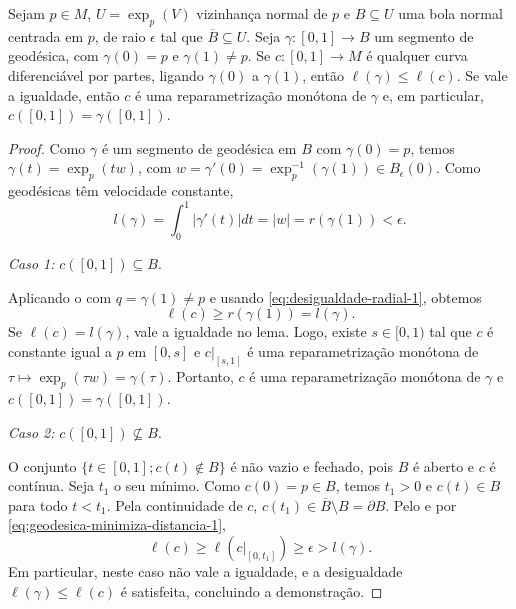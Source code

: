 \begin{theorem}
    \label{teo:geodesica-minimiza-distancia}
    Sejam $p \in M$, $U=\exp_{p}(V)$ vizinhança normal de $p$ e $B\subseteq U$ uma bola normal centrada em $p$, de raio $\epsilon$ tal que $\overline{B}\subseteq U$.
    Seja $\gamma:[0,1]\to B$ um segmento de geodésica, com $\gamma(0)=p$ e $\gamma(1)\neq p$.
    Se $c:[0,1]\to M$ é qualquer curva diferenciável por partes, ligando $\gamma(0)$ a $\gamma(1)$, então $\ell(\gamma)\leq \ell(c)$.
    Se vale a igualdade, então $c$ é uma reparametrização monótona de $\gamma$ e, em particular, $c([0,1])=\gamma([0,1])$.
    \begin{proof}

        Como $\gamma$ é um segmento de geodésica em $B$ com $\gamma(0)=p$, temos $\gamma(t)=\exp_{p}(tw)$, com $w=\gamma'(0)=\exp_{p}^{-1}(\gamma(1))\in B_{\epsilon}(0)$. Como geodésicas têm velocidade constante,
        \begin{equation}
            \label{eq:geodesica-minimiza-distancia-1}
            l(\gamma)=\int_{0}^{1}|\gamma'(t)|dt=|w|=r(\gamma(1))<\epsilon.
        \end{equation}

        \emph{Caso 1:} $c([0,1])\subseteq B$.

        Aplicando o  com $q=\gamma(1)\neq p$ e usando \eqref{eq:desigualdade-radial-1}, obtemos
        \begin{equation*}
            \ell(c)\geq r(\gamma(1))=l(\gamma).
        \end{equation*}
        Se $\ell(c)=l(\gamma)$, vale a igualdade no lema. Logo, existe $s\in[0,1)$ tal que $c$ é constante igual a $p$ em $[0,s]$ e $c|_{[s,1]}$ é uma reparametrização monótona de $\tau\mapsto\exp_{p}(\tau w)=\gamma(\tau)$. Portanto, $c$ é uma reparametrização monótona de $\gamma$ e $c([0,1])=\gamma([0,1])$.

        \emph{Caso 2:} $c([0,1])\nsubseteq B$.

        O conjunto $\{ t\in[0,1]; c(t)\notin B \}$ é não vazio e fechado, pois $B$ é aberto e $c$ é contínua. Seja $t_{1}$ o seu mínimo. Como $c(0)=p\in B$, temos $t_{1}>0$ e $c(t)\in B$ para todo $t<t_{1}$. Pela continuidade de $c$, $c(t_{1})\in\overline{B}\setminus B=\partial B$. Pelo  e por \eqref{eq:geodesica-minimiza-distancia-1},
        \begin{equation*}
            \ell(c)\geq \ell(c|_{[0,t_{1}]})\geq\epsilon>l(\gamma).
        \end{equation*}
        Em particular, neste caso não vale a igualdade, e a desigualdade $\ell(\gamma)\leq \ell(c)$ é satisfeita, concluindo a demonstração.
    \end{proof}
\end{theorem}
